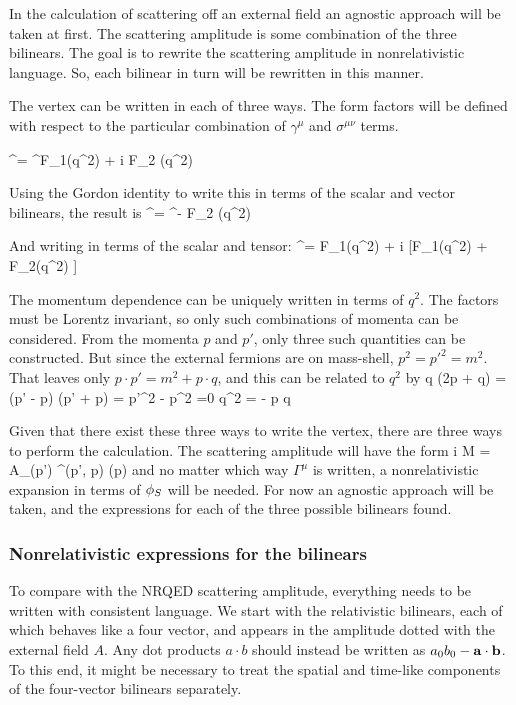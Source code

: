 In the calculation of scattering off an external field an agnostic approach will be taken at first.  The scattering amplitude is some combination of the three bilinears.  The goal is to rewrite the scattering amplitude in nonrelativistic language.  So, each bilinear in turn will be rewritten in this manner.

The vertex can be written in each of three ways.  The form factors will be defined with respect to the particular combination of $\gamma^\mu$ and $\sigma^{\mu\nu}$ terms.

\beq
	\Gamma^\mu = \gamma^\mu F_1(q^2) + i  F_2 (q^2)
\eeq

Using the Gordon identity to write this in terms of the scalar and vector bilinears, the result is
\beq
	\Gamma^\mu = \gamma^\mu [F_1(q^2) + F_2(q^2) ]  -  F_2 (q^2)
\eeq

And writing in terms of the scalar and tensor:
\beq
	\Gamma^\mu =  F_1(q^2) + i  [F_1(q^2) + F_2(q^2) ] 
\eeq

The momentum dependence can be uniquely written in terms of $q^2$.  The factors must be Lorentz invariant, so only such combinations of momenta can be considered.  From the momenta $p$ and $p'$, only three such quantities can be constructed.  But since the external fermions are on mass-shell, $p^2 = p'^2 = m^2$.  That leaves only $p \cdot p' = m^2 + p \cdot q$, and this can be related to $q^2$ by
\beq	
	q \cdot (2p + q) = (p' - p) \cdot (p' + p) = p'^2 - p^2 =0 \to q^2 = - p \cdot q
\eeq


Given that there exist these three ways to write the vertex, there are three ways to perform the calculation.  The scattering amplitude will have the form
\beq	
	i M = 	A_\mu \srb(p') \Gamma^\mu(p', p) \sr(p) 
\eeq
and no matter which way $\Gamma^\mu$ is written, a nonrelativistic expansion in terms of $\phi_S$ will be needed.  For now an agnostic approach will be taken, and the expressions for each of the three possible bilinears found.


\subsubsection{Nonrelativistic expressions for the bilinears}
To compare with the NRQED scattering amplitude, everything needs to be written with consistent language.  We start with the relativistic bilinears, each of which behaves like a four vector, and appears in the amplitude dotted with the external field $A$.  Any dot products $a \cdot b$ should instead be written as $a_0 b_0 - \mathbf{a} \cdot \mathbf{b}$.  To this end, it might be necessary to treat the spatial and time-like components of the four-vector bilinears separately.

